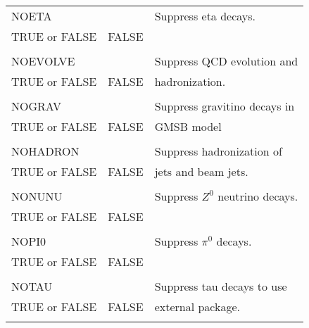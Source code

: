 \newpage
\begin{center}
\begin{tabular}{lll}
\hline\hline
NOETA                  &                   & Suppress eta decays.           \\
TRUE or FALSE          & FALSE             &                                \\
                       &                   &                                \\
NOEVOLVE               &                   & Suppress QCD evolution and     \\
TRUE or FALSE          & FALSE             & hadronization.                 \\
                       &                   &                                \\
NOGRAV                 &                   & Suppress gravitino decays in   \\
TRUE or FALSE          & FALSE             & GMSB model                     \\
                       &                   &                                \\
NOHADRON               &                   & Suppress hadronization of      \\
TRUE or FALSE          & FALSE             & jets and beam jets.            \\
                       &                   &                                \\
NONUNU                 &                   & Suppress $Z^0$ neutrino decays.\\
TRUE or FALSE          & FALSE             &                                \\
                       &                   &                                \\
NOPI0                  &                   &Suppress $\pi^0$ decays.        \\
TRUE or FALSE          & FALSE             &                                \\
                       &                   &                                \\
NOTAU                  &                   & Suppress tau decays to use     \\
TRUE or FALSE          & FALSE             & external package.              \\
                       &                   &                                \\

\end{tabular}
\end{center}
